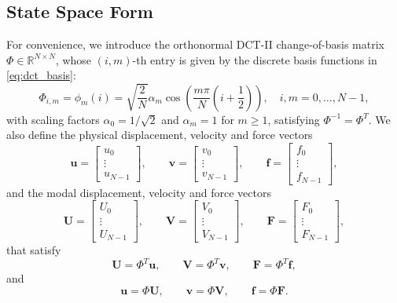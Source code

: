 \documentclass{Configuration_Files/PoliMi3i_thesis}
\newif\ifshowthesischanges
\DeclareRobustCommand{\thesischange}[2]{%
    \ifshowthesischanges
        \textcolor{#1}{#2}%
    \else
        #2%
    \fi
}
\def\thesischange#1#2{#2}%
\begin{document}
\subsection{State Space Form}
\thesischange{blue}{For convenience, we introduce the orthonormal DCT-II change-of-basis matrix $\Phi \in \mathbb{R}^{N \times N}$, whose $(i,m)$-th entry is given by the discrete basis functions in \eqref{eq:dct_basis}:
\begin{equation}
\Phi_{i,m} = \phi_m(i) = \sqrt{\frac{2}{N}} \alpha_m \cos\!\left(\frac{m\pi}{N}\left(i + \frac{1}{2}\right)\right), \quad i, m = 0, \dots, N-1,
\label{eq:phi_matrix_def}
\end{equation}
with scaling factors $\alpha_0 = 1/\sqrt{2}$ and $\alpha_m = 1$ for $m \ge 1$, satisfying $\Phi^{-1} = \Phi^T$. We also define} the physical displacement, velocity and force vectors
\begin{equation*}
\mathbf u
=
\begin{bmatrix}
u_0\\
\vdots\\
u_{N-1}
\end{bmatrix},
\qquad
\mathbf v
=
\begin{bmatrix}
v_0\\
\vdots\\
v_{N-1}
\end{bmatrix},
\qquad
\mathbf f
=
\begin{bmatrix}
f_0\\
\vdots\\
f_{N-1}
\end{bmatrix},
\end{equation*}
and the modal displacement, velocity and force vectors
\begin{equation*}
\mathbf U
=
\begin{bmatrix}
U_0\\
\vdots\\
U_{N-1}
\end{bmatrix},
\qquad
\mathbf V
=
\begin{bmatrix}
V_0\\
\vdots\\
V_{N-1}
\end{bmatrix},
\qquad
\mathbf F
=
\begin{bmatrix}
F_0\\
\vdots\\
F_{N-1}
\end{bmatrix},
\end{equation*}
that satisfy
\begin{equation*}
\mathbf U
=
\Phi^T\mathbf u,
\qquad
\mathbf V
=
\Phi^T\mathbf v,
\qquad
\mathbf F
=
\Phi^T\mathbf f,
\end{equation*}
and
\begin{equation*}
\mathbf u
=
\Phi\mathbf U,
\qquad
\mathbf v
=
\Phi\mathbf V,
\qquad
\mathbf f
=
\Phi\mathbf F.
\end{equation*}
\end{document}
